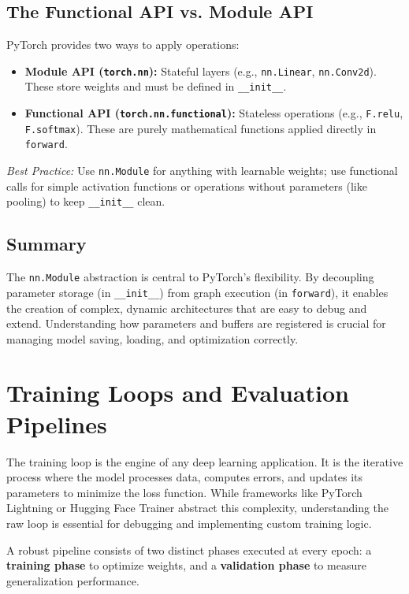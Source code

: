 \documentclass[12pt,a4paper]{report}
\begin{document}
\subsection{The Functional API vs. Module API}
PyTorch provides two ways to apply operations:
\begin{itemize}
    \item \textbf{Module API (\texttt{torch.nn}):} Stateful layers (e.g., \texttt{nn.Linear}, \texttt{nn.Conv2d}). These store weights and must be defined in \texttt{\_\_init\_\_}.
    \item \textbf{Functional API (\texttt{torch.nn.functional}):} Stateless operations (e.g., \texttt{F.relu}, \texttt{F.softmax}). These are purely mathematical functions applied directly in \texttt{forward}.
\end{itemize}
\textit{Best Practice:} Use \texttt{nn.Module} for anything with learnable weights; use functional calls for simple activation functions or operations without parameters (like pooling) to keep \texttt{\_\_init\_\_} clean.

\subsection{Summary}
The \texttt{nn.Module} abstraction is central to PyTorch's flexibility. By decoupling parameter storage (in \texttt{\_\_init\_\_}) from graph execution (in \texttt{forward}), it enables the creation of complex, dynamic architectures that are easy to debug and extend. Understanding how parameters and buffers are registered is crucial for managing model saving, loading, and optimization correctly.

\section{Training Loops and Evaluation Pipelines}

The training loop is the engine of any deep learning application. It is the iterative process where the model processes data, computes errors, and updates its parameters to minimize the loss function. While frameworks like PyTorch Lightning or Hugging Face Trainer abstract this complexity, understanding the raw loop is essential for debugging and implementing custom training logic.

A robust pipeline consists of two distinct phases executed at every epoch: a \textbf{training phase} to optimize weights, and a \textbf{validation phase} to measure generalization performance.
\end{document}

